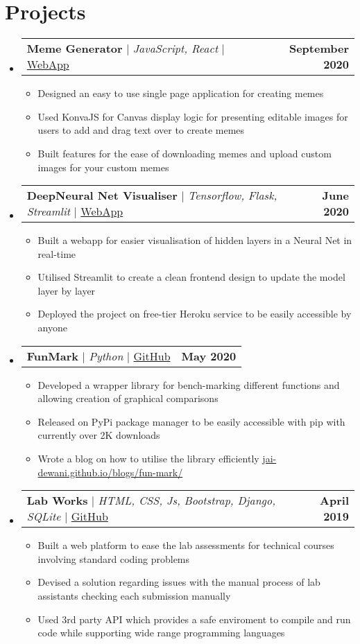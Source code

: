 \documentclass[letterpaper,11pt]{article}
\makeatletter
\newcommand{\resumeItem}[1]{
  \item\small{
    {#1 \vspace{-2pt}}
  }
}
\newcommand{\resumeProjectHeading}[2]{
    \item
    \begin{tabular*}{1.001\textwidth}{l@{\extracolsep{\fill}}r}
      \small#1 & \textbf{\small #2} \\
    \end{tabular*}\vspace{-7pt}
}
\newcommand{\resumeSubHeadingListStart}{\begin{itemize}[leftmargin=0.0in, label={}]}
\newcommand{\resumeSubHeadingListEnd}{\end{itemize}}
\newcommand{\resumeItemListStart}{\justify \begin{itemize}}
\newcommand{\resumeItemListEnd}{\end{itemize}\vspace{-2pt}}
\makeatother
\begin{document}
\section{Projects}
    \vspace{-5pt}
    \resumeSubHeadingListStart
        \resumeProjectHeading
            {\textbf{Meme Generator} $|$ \emph{JavaScript, React}  $|$ \href{https://jai-dewani.github.io/Meme-App/}{WebApp}}{September 2020}
            \resumeItemListStart
                \resumeItem{Designed an easy to use single page application for creating memes}
                \resumeItem{Used KonvaJS for Canvas display logic for presenting editable images for users to add and drag text over to create memes}
                \resumeItem{Built features for the ease of downloading memes and upload custom images for your custom memes}
            \resumeItemListEnd
        \resumeProjectHeading
            {\textbf{DeepNeural Net Visualiser} $|$ \emph{Tensorflow, Flask, Streamlit} $|$ \href{https://visualize-neural-network.herokuapp.com/}{WebApp}}{June 2020} 
            \resumeItemListStart
                \resumeItem{Built a webapp for easier visualisation of hidden layers in a Neural Net in real-time}
                \resumeItem{Utilised Streamlit to create a clean frontend design to update the model layer by layer}
                \resumeItem{Deployed the project on free-tier Heroku service to be easily accessible by anyone}
            \resumeItemListEnd 
        \resumeProjectHeading
            {\textbf{FunMark} $|$ \emph{Python} $|$ \href{https://github.com/jai-dewani/fun-mark}{GitHub}}{May 2020} 
            \resumeItemListStart
                \resumeItem{Developed a wrapper library for bench-marking different functions and allowing creation of graphical comparisons}
                \resumeItem{Released on PyPi package manager to be easily accessible with pip with currently over 2K downloads}
                \resumeItem{Wrote a blog on how to utilise the library efficiently \href{https://jai-dewani.github.io/blogs/fun-mark/}{jai-dewani.github.io/blogs/fun-mark/}}
            \resumeItemListEnd 
        \resumeProjectHeading
            {\textbf{Lab Works} $|$ \emph{HTML, CSS, Js, Bootstrap, Django, SQLite} $|$ \href{https://github.com/jai-dewani/Lab-Works}{GitHub}}{April 2019} 
            \resumeItemListStart
                \resumeItem{Built a web platform to ease the lab assessments for technical courses involving standard coding problems }
                \resumeItem{Devised a solution regarding issues with the manual process of lab assistants checking each submission manually}
                \resumeItem{Used 3rd party API which provides a safe enviroment to compile and run code while supporting wide range programming languages}
            \resumeItemListEnd 
    \resumeSubHeadingListEnd
\end{document}
